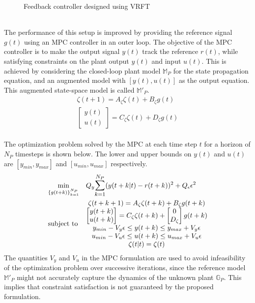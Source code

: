 \documentclass[letterpaper, 10 pt, conference]{ieeeconf}  %
\begin{document}
\begin{enumerate}
\begin{figure}[h]
	\caption{Feedback controller designed using VRFT}
	\end{figure}
	\\
	The performance of this setup is improved by providing the reference signal $g(t)$ using an MPC controller in an outer loop. The objective of the MPC controller is to make the output signal $y(t)$ track the reference $r(t)$, while satisfying constraints on the plant output $y(t)$ and input $u(t)$. This is achieved by considering the closed-loop plant model $\mathbb{M}_P$ for the state propagation equation, and an augmented model with $[y(t),u(t)]$ as the output equation. This augmented state-space model is called $\mathbb{M}'_P$.
	\begin{equation*}
	\begin{matrix}
	\zeta(t+1) = A_\zeta\zeta(t) + B_\zeta g(t)\\
	\begin{bmatrix}y(t)\\u(t)\end{bmatrix} = C_\zeta\zeta(t) + D_\zeta g(t)
	\end{matrix}
	\end{equation*}
	\\
	The optimization problem solved by the MPC at each time step $t$ for a horizon of $N_P$ timesteps is shown below. The lower and upper bounds on $y(t)$ and $u(t)$ are $[y_{min},y_{max}]$ and $[u_{min},u_{max}]$ respectively.
	\begin{equation}
	\begin{aligned}
	& \underset{\{g(t+k)\}_{k=1}^{N_P}}{\text{min}}
	& & Q_y\mathlarger{\sum\limits_{k=1}^{N_P}}(y(t+k|t)-r(t+k))^2 + Q_{\epsilon}\epsilon^2 \\
	& \text{subject to}
	& & 
	\begin{matrix}
	\zeta(t+k+1) = A_\zeta\zeta(t+k) + B_\zeta g(t+k)\\
	\begin{bmatrix}y(t+k)\\u(t+k)\end{bmatrix} = C_\zeta\zeta(t+k) + \begin{bmatrix}0\\D_\zeta\end{bmatrix}g(t+k)\\
	y_{min}-V_y\epsilon \leq y(t+k) \leq y_{max}+V_y\epsilon \\
	u_{min}-V_u\epsilon \leq u(t+k) \leq u_{max}+V_u\epsilon \\
	\zeta(t|t) = \zeta(t)
	\end{matrix}
	\end{aligned}
	\label{MPC}
	\end{equation}
	The quantities $V_y$ and $V_u$ in the MPC formulation are used to avoid infeasibility of the optimization problem over successive iterations, since the reference model $\mathbb{M}'_P$ might not accurately capture the dynamics of the unknown plant $\mathbb{G}_P$. This implies that constraint satisfaction is not guaranteed by the proposed formulation. 
	

\end{enumerate}
\end{document}
